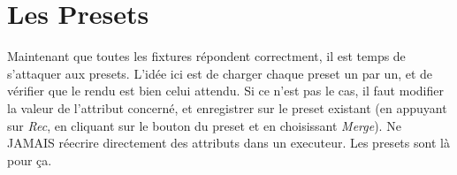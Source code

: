 \section{Les Presets}
\label{sec:adapter_presets}

Maintenant que toutes les fixtures répondent correctment, il est temps de s'attaquer aux presets.
\newline
L'idée ici est de charger chaque preset un par un, et de vérifier que le rendu est bien celui attendu.
Si ce n'est pas le cas, il faut modifier la valeur de l'attribut concerné, et enregistrer sur le preset existant (en appuyant sur \textit{Rec}, en cliquant sur le bouton du preset et en choisissant \textit{Merge}).
\newline
\newline
Ne JAMAIS réecrire directement des attributs dans un executeur. Les presets sont là pour ça.

